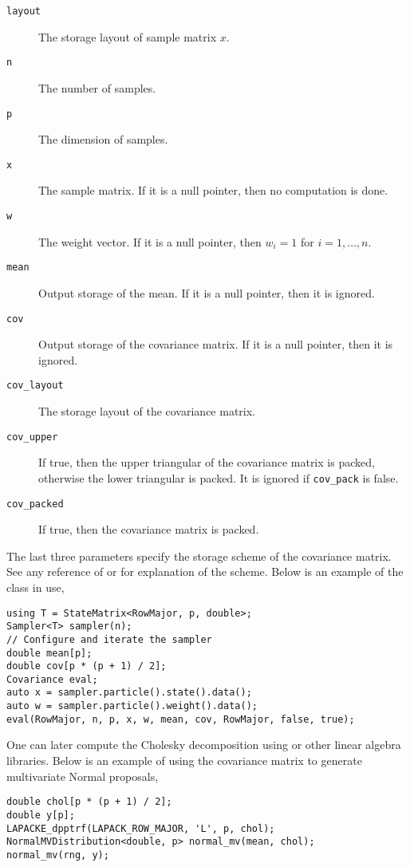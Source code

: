 \begin{description}
  \item[\texttt{layout}] The storage layout of sample matrix $x$.
  \item[\texttt{n}] The number of samples.
  \item[\texttt{p}] The dimension of samples.
  \item[\texttt{x}] The sample matrix. If it is a null pointer, then no
    computation is done.
  \item[\texttt{w}] The weight vector. If it is a null pointer, then $w_i = 1$
    for $i = 1,\dots,n$.
  \item[\texttt{mean}] Output storage of the mean. If it is a null pointer,
    then it is ignored.
  \item[\texttt{cov}] Output storage of the covariance matrix. If it is a null
    pointer, then it is ignored.
  \item[\texttt{cov\_layout}] The storage layout of the covariance matrix.
  \item[\texttt{cov\_upper}] If true, then the upper triangular of the
    covariance matrix is packed, otherwise the lower triangular is packed.
    It is ignored if \verb|cov_pack| is false.
  \item[\texttt{cov\_packed}] If true, then the covariance matrix is
    packed.
\end{description}

The last three parameters specify the storage scheme of the covariance matrix.
See any reference of \blas or \lapack for explanation of the scheme. Below is
an example of the class in use,
\begin{Verbatim}
using T = StateMatrix<RowMajor, p, double>;
Sampler<T> sampler(n);
// Configure and iterate the sampler
double mean[p];
double cov[p * (p + 1) / 2];
Covariance eval;
auto x = sampler.particle().state().data();
auto w = sampler.particle().weight().data();
eval(RowMajor, n, p, x, w, mean, cov, RowMajor, false, true);
\end{Verbatim}
One can later compute the Cholesky decomposition using \lapack or other linear
algebra libraries. Below is an example of using the covariance matrix to
generate multivariate Normal proposals,
\begin{Verbatim}
double chol[p * (p + 1) / 2];
double y[p];
LAPACKE_dpptrf(LAPACK_ROW_MAJOR, 'L', p, chol);
NormalMVDistribution<double, p> normal_mv(mean, chol);
normal_mv(rng, y);
\end{Verbatim}

